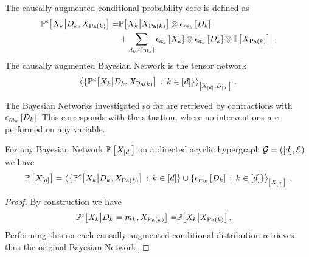 \begin{definition}
    The causally augmented conditional probability core is defined as
    \begin{align*}
        \mathbb{P}^{c}\big[X_{k}\big|D_{k},X_{\mathrm{Pa}(k)}\big]
        =& \mathbb{P}\big[X_{k}\big|X_{\mathrm{Pa}(k)}\big] \otimes \epsilon_{m_{k}}\left[D_{k}\right] \\
        &+ \sum_{d_{k}\in[m_{k}]} \epsilon_{d_{k}}\left[X_{k}\right] \otimes \epsilon_{d_{k}}\left[D_{k}\right] \otimes \mathbb{I}\left[X_{\mathrm{Pa}(k)}\right]\, .
    \end{align*}
    The causally augmented Bayesian Network is the tensor network
    \begin{align*}
        \left\langle 
            \{\mathbb{P}^{c}\big[X_{k}\big|D_{k},X_{\mathrm{Pa}(k)}\big] \,:\, k\in[d]\}
        \right\rangle_{\left[ X_{[d]},D_{[d]} \right]} \, .
    \end{align*}
\end{definition}

The Bayesian Networks investigated so far are retrieved by contractions with $\epsilon_{m_{k}}\left[D_{k}\right]$.
This corresponds with the situation, where no interventions are performed on any variable.

\begin{lemma}
    For any Bayesian Network $\mathbb{P}\left[X_{[d]}\right]$ on a directed acyclic hypergraph $\mathcal{G}=([d],\mathcal{E})$ we have
    \begin{align*}
        \mathbb{P}\left[X_{[d]}\right] =
        \left\langle 
            \{\mathbb{P}^{c}\big[X_{k}\big|D_{k},X_{\mathrm{Pa}(k)}\big] \,:\, k\in[d]\}
            \cup \{\epsilon_{m_{k}}\left[D_{k}\right] \,:\, k\in[d] \}
        \right\rangle_{\left[ X_{[d]} \right]} \, .
    \end{align*}
\end{lemma}
\begin{proof}
    By construction we have
    \begin{align*}
        \mathbb{P}^{c}\big[X_{k}\big|D_{k}=m_{k},X_{\mathrm{Pa}(k)}\big]
        =& \mathbb{P}\big[X_{k}\big|X_{\mathrm{Pa}(k)}\big]  \, .
    \end{align*}
    Performing this on each causally augmented conditional distribution retrieves thus the original Bayesian Network.
\end{proof}


